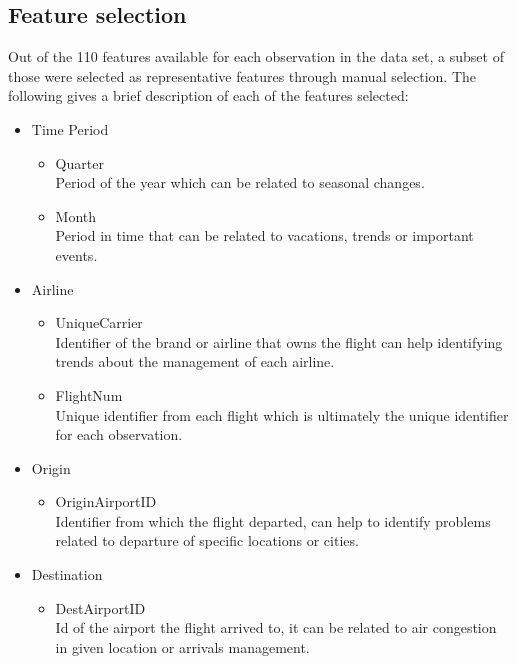 \documentclass{article}
\begin{document}
    \subsection{Feature selection}
    Out of the 110 features available for each observation in the data set, a subset
    of those were selected as representative features through manual selection. The following
	gives a brief description of each of the features selected:
    \begin{itemize}
        \item Time Period
        \begin{itemize}
            \item Quarter\\
                Period of the year which can be related to seasonal changes.
            \item Month\\
                Period in time that can be related to vacations, trends or important
                 events.
        \end{itemize}
        \item Airline
        \begin{itemize}
            \item UniqueCarrier\\
                Identifier of the brand or airline that owns the flight can help
                identifying trends about the management of each airline.
            \item FlightNum\\
                Unique identifier from each flight which is ultimately the unique
                identifier for each observation.
        \end{itemize}
        \item Origin
        \begin{itemize}
            \item OriginAirportID\\
                Identifier from which the flight departed, can help to identify
                problems related to departure of specific locations or cities.
        \end{itemize}
        \item Destination
        \begin{itemize}
            \item DestAirportID\\
                Id of the airport the flight arrived to, it can be related
                to air congestion in given location or arrivals management.

\end{itemize}
\end{itemize}
\end{document}
